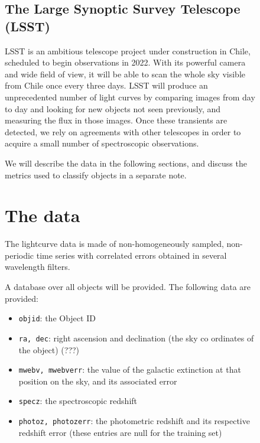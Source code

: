 \documentclass[\docopts]{\docclass}
\begin{document}
\begin{figure}[htbp!]

\subsection{The Large Synoptic Survey Telescope (LSST)}
LSST is an ambitious telescope project under construction in Chile, scheduled to begin observations in 2022. With its powerful camera and wide field of view, it will be able to scan the whole sky visible from Chile once every three days. LSST will produce an unprecedented number of light curves by comparing images from day to day and looking for new objects not seen previously, and measuring the flux in those images. Once these transients are detected, we rely on agreements with other telescopes in order to acquire a small number of spectroscopic observations.


We will describe the data in the following sections, and discuss the metrics used to classify objects in a separate note.
\section{The data}
\label{sec:thedata}
The lightcurve data is made of non-homogeneously sampled, non-periodic time series with correlated errors obtained in several wavelength filters.

A database over all objects will be provided. The following data are provided:

\begin{itemize}
\item {\tt objid}: the Object ID
\item {\tt ra, dec}: right ascension and declination (the sky co ordinates of the object) (???)
\item {\tt mwebv, mwebverr}: the value of the galactic extinction at that position on the sky, and its associated error
\item {\tt specz}: the spectroscopic redshift
\item {\tt photoz, photozerr}: the photometric redshift and its respective redshift error (these entries are null for the training set)
\end{itemize}


\end{figure}
\end{document}
